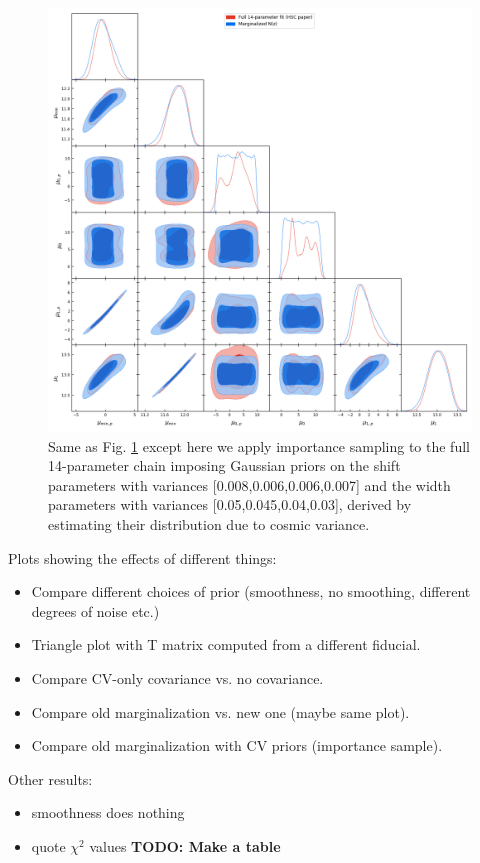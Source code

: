 \documentclass[a4paper,11pt]{article}
\newcommand{\todo}[1]{{\bf TODO: #1}}
\begin{document}
\begin{figure}[ht]
\centering  
\includegraphics[width=1.\textwidth]{./importance_noburn}
\caption{Same as Fig.
\ref{fig:triangle_fid_marg} except 
here we apply importance sampling 
to the full 14-parameter chain 
imposing Gaussian priors on the
shift parameters with variances
[0.008,0.006,0.006,0.007] and the
width parameters with
variances [0.05,0.045,0.04,0.03],
derived by estimating their
distribution due to 
cosmic variance.}
\label{fig:triangle_fid_marg}
\end{figure}


Plots showing the effects of different things:
\begin{itemize}
\item Compare different choices of prior (smoothness, no smoothing, different degrees of noise etc.)
\item Triangle plot with T matrix computed from a different fiducial.
\item Compare CV-only covariance vs. no covariance.
\item Compare old marginalization vs. new one (maybe same plot).
\item Compare old marginalization with CV priors (importance sample).
\end{itemize}

Other results:
\begin{itemize}
  \item smoothness does nothing
  \item quote $\chi^2$ values \todo{Make a table}
\end{itemize}
\end{document}
